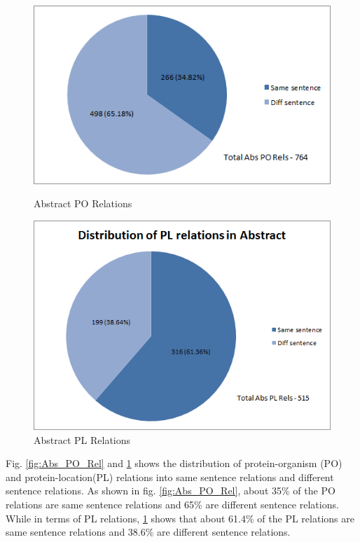 \begin{figure}
\centering
\begin{minipage}{.5\textwidth}
  \centering
  \includegraphics[width=.95\textwidth]{figures/AbsPORels_sent_Distribution.png}
  \caption{Abstract PO Relations}
  \label{fig:Abs_PO_Rel}
\end{minipage}%
\begin{minipage}{.5\textwidth}
  \centering
  \includegraphics[width=.95\textwidth]{figures/AbsPLRels_sent_Distribution.png}
  \caption{Abstract PL Relations}
  \label{fig:Abs_PL_Rel}
\end{minipage}
\end{figure}


Fig. \ref{fig:Abs_PO_Rel} and \ref{fig:Abs_PL_Rel} shows the distribution of protein-organism (PO) and protein-location(PL) relations into same sentence relations and different sentence relations. As shown in fig. \ref{fig:Abs_PO_Rel}, about 35\% of the PO relations are same sentence relations and 65\% are different sentence relations. While in terms of PL relations, \ref{fig:Abs_PL_Rel} shows that about 61.4\% of the PL relations are same sentence relations and 38.6\% are different sentence relations.

